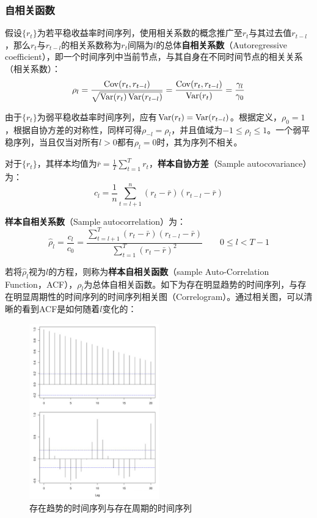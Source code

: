 \documentclass[11pt]{article}
\begin{document}
\subsubsection{自相关函数}

假设$\{r_t\}$为若平稳收益率时间序列，使用相关系数的概念推广至$r_t$与其过去值$r_{t-l}$，那么$r_t$与$r_{t-l}$的相关系数称为$r_{t}$间隔为$l$的总体\textbf{自相关系数}（Autoregressive coefficient），即一个时间序列中当前节点，与其自身在不同时间节点的相关关系（相关系数）：
\begin{equation*}
    \rho_l = \frac{\operatorname{Cov}(r_t,r_{t-l})}{\sqrt{\operatorname{Var}(r_t)\operatorname{Var}(r_{t-l})}} 
    = \frac{\operatorname{Cov}(r_t,r_{t-l})}{\operatorname{Var}(r_t)}
    = \frac{\gamma_l}{\gamma_0}
\end{equation*}

由于$\{r_t\}$为弱平稳收益率时间序列，应有$\operatorname{Var}(r_t) = \operatorname{Var}(r_{t-l})$。根据定义，$\rho_0=1$，根据自协方差的对称性，同样可得$\rho_{-l}=\rho_l$，并且值域为$-1 \leq \rho_l \leq 1$。一个弱平稳序列，当且仅当对所有$l>0$都有$\rho_l=0$时，其为序列不相关。

对于$\{r_t\}$，其样本均值为$\bar{r}=\frac{1}{T} \sum_{t=1}^{T} r_t$，\textbf{样本自协方差}（Sample autocovariance）为：
\begin{equation*}
    c_l = \frac{1}{n} \sum_{t=l+1}^{n} (r_t-\bar{r})(r_{t-l}-\bar{r})
\end{equation*}

\textbf{样本自相关系数}（Sample autocorrelation）为：
\begin{equation*}
    \hat{\rho}_l = \frac{c_l}{c_0} = \frac{\sum_{t=l+1}^{T}(r_t-\bar{r})(r_{t-l}-\bar{r})}{\sum_{t=1}^{T}(r_t-\bar{r})^2} \qquad 0 \leq l < T-1
\end{equation*}

若将$\hat{\rho}_l$视为$l$的方程，则称为\textbf{样本自相关函数}（sample Auto-Correlation Function，ACF），$\rho_l$为总体自相关函数。如下为存在明显趋势的时间序列，与存在明显周期性的时间序列的时间序列相关图（Correlogram）。通过相关图，可以清晰的看到ACF是如何随着$l$变化的：

\begin{figure}[H]
    \centering
    \includegraphics[width=0.5\textwidth]{fig/ts-trend.png}
    \caption{存在趋势的时间序列与存在周期的时间序列}
    \label{fig:ts-trend}
\end{figure}
\end{document}
